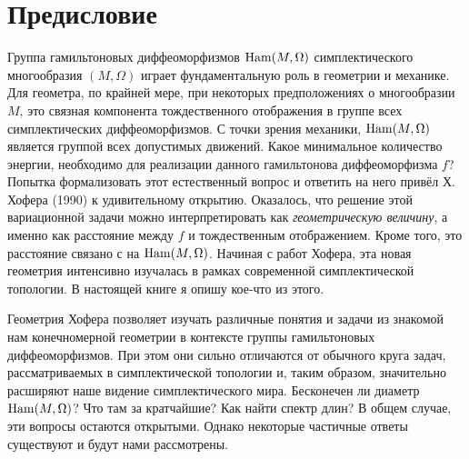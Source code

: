 \chapter{Предисловие}

Группа гамильтоновых диффеоморфизмов $\mathrm{Ham}(M,\Omega)$ симплектического многообразия $(M,\Omega)$ играет фундаментальную роль  в геометрии и механике.
Для геометра, по крайней мере, при некоторых предположениях о многообразии $M$, это связная компонента тождественного отображения в группе всех симплектических диффеоморфизмов.
С точки зрения механики, $\mathrm{Ham}(M,\Omega)$ является группой всех допустимых движений.
Какое минимальное количество энергии, необходимо для реализации данного гамильтонова диффеоморфизма $f$?
Попытка формализовать этот естественный вопрос и ответить на него привёл Х. Хофера \cite{H1} (1990) к удивительному открытию.
Оказалось, что решение этой вариационной задачи можно интерпретировать как \emph{геометрическую величину}, а именно как расстояние между $f$ и тождественным отображением.
Кроме того, это расстояние связано с  на $\mathrm{Ham}(M,\Omega)$. 
Начиная с работ Хофера, эта новая геометрия интенсивно изучалась в рамках современной симплектической топологии.
В настоящей книге я опишу кое-что из этого.

Геометрия Хофера позволяет изучать различные понятия и задачи из знакомой нам конечномерной геометрии в контексте группы гамильтоновых диффеоморфизмов.
При этом они сильно отличаются от обычного круга задач, рассматриваемых в симплектической топологии и, таким образом, значительно расширяют наше видение симплектического мира.
Бесконечен ли диаметр $\mathrm{Ham}(M,\Omega)$?
Что там за кратчайшие?
Как найти спектр длин?
В общем случае, эти вопросы остаются открытыми.
Однако некоторые частичные ответы существуют и будут нами рассмотрены.

